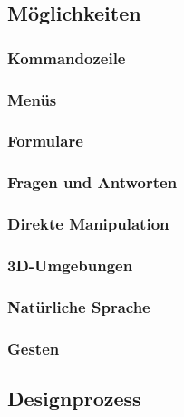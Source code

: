 \documentclass[a4paper, 11pt, accentcolor = tud3b]{tudreport}
\begin{document}
			\subsection{Möglichkeiten} %

				\subsubsection{Kommandozeile} %

				\subsubsection{Menüs} %

				\subsubsection{Formulare} %

				\subsubsection{Fragen und Antworten} %

				\subsubsection{Direkte Manipulation} %

				\subsubsection{3D-Umgebungen} %

				\subsubsection{Natürliche Sprache} %

				\subsubsection{Gesten} %

			\subsection{Designprozess} %
\end{document}

